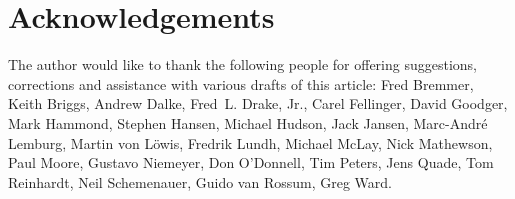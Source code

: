 \documentclass{howto}
\begin{document}
\section{Acknowledgements}

The author would like to thank the following people for offering
suggestions, corrections and assistance with various drafts of this
article: Fred Bremmer, Keith Briggs, Andrew Dalke, Fred~L. Drake, Jr.,
Carel Fellinger, David Goodger, Mark Hammond, Stephen Hansen, Michael
Hudson, Jack Jansen, Marc-Andr\'e Lemburg, Martin von L\"owis, Fredrik
Lundh, Michael McLay, Nick Mathewson, Paul Moore, Gustavo Niemeyer,
Don O'Donnell, Tim Peters, Jens Quade, Tom Reinhardt, Neil
Schemenauer, Guido van Rossum, Greg Ward.
\end{document}
